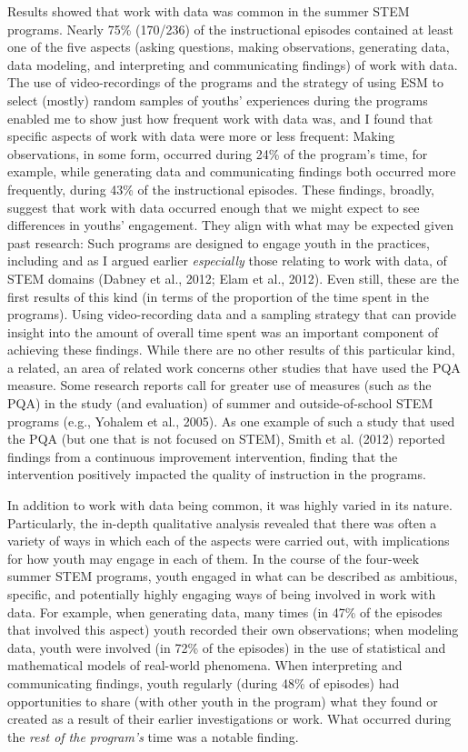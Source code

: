 \documentclass[]{book}
\theoremstyle{definition}
\theoremstyle{definition}
\theoremstyle{definition}
\theoremstyle{remark}
\begin{document}
Results showed that work with data was common in the summer STEM
programs. Nearly 75\% (170/236) of the instructional episodes contained
at least one of the five aspects (asking questions, making observations,
generating data, data modeling, and interpreting and communicating
findings) of work with data. The use of video-recordings of the programs
and the strategy of using ESM to select (mostly) random samples of
youths' experiences during the programs enabled me to show just how
frequent work with data was, and I found that specific aspects of work
with data were more or less frequent: Making observations, in some form,
occurred during 24\% of the program's time, for example, while
generating data and communicating findings both occurred more
frequently, during 43\% of the instructional episodes. These findings,
broadly, suggest that work with data occurred enough that we might
expect to see differences in youths' engagement. They align with what
may be expected given past research: Such programs are designed to
engage youth in the practices, including and as I argued earlier
\emph{especially} those relating to work with data, of STEM domains
(Dabney et al., 2012; Elam et al., 2012). Even still, these are the
first results of this kind (in terms of the proportion of the time spent
in the programs). Using video-recording data and a sampling strategy
that can provide insight into the amount of overall time spent was an
important component of achieving these findings. While there are no
other results of this particular kind, a related, an area of related
work concerns other studies that have used the PQA measure. Some
research reports call for greater use of measures (such as the PQA) in
the study (and evaluation) of summer and outside-of-school STEM programs
(e.g., Yohalem et al., 2005). As one example of such a study that used
the PQA (but one that is not focused on STEM), Smith et al. (2012)
reported findings from a continuous improvement intervention, finding
that the intervention positively impacted the quality of instruction in
the programs.

In addition to work with data being common, it was highly varied in its
nature. Particularly, the in-depth qualitative analysis revealed that
there was often a variety of ways in which each of the aspects were
carried out, with implications for how youth may engage in each of them.
In the course of the four-week summer STEM programs, youth engaged in
what can be described as ambitious, specific, and potentially highly
engaging ways of being involved in work with data. For example, when
generating data, many times (in 47\% of the episodes that involved this
aspect) youth recorded their own observations; when modeling data, youth
were involved (in 72\% of the episodes) in the use of statistical and
mathematical models of real-world phenomena. When interpreting and
communicating findings, youth regularly (during 48\% of episodes) had
opportunities to share (with other youth in the program) what they found
or created as a result of their earlier investigations or work. What
occurred during the \emph{rest of the program's} time was a notable
finding.
\end{document}
